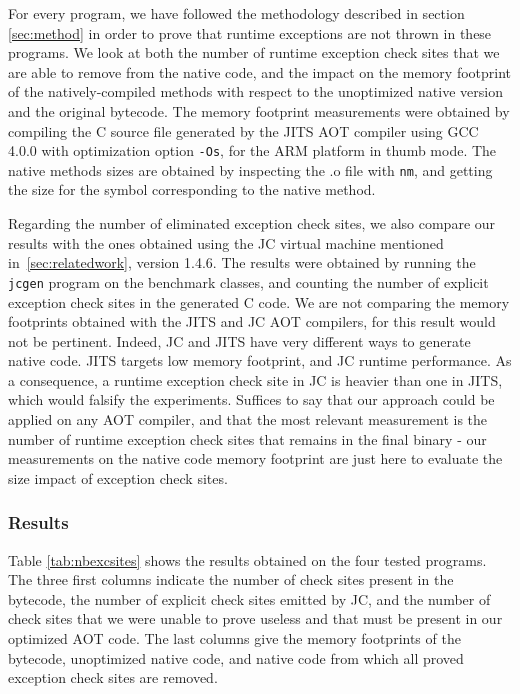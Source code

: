 For every program, we have followed the methodology described in section \ref{sec:method} in order to prove that runtime exceptions are not thrown in these programs. We look at both the number of runtime exception check sites that we are able to remove from the native code, and the impact on the memory footprint of the natively-compiled methods with respect to the unoptimized native version and the original bytecode. The memory footprint measurements were obtained by compiling the C source file generated by the JITS AOT compiler using GCC 4.0.0 with optimization option \texttt{-Os}, for the ARM platform in thumb mode. The native methods sizes are obtained by inspecting the .o file with \texttt{nm}, and getting the size for the symbol corresponding to the native method.

Regarding the number of eliminated exception check sites, we also compare our results with the ones obtained using the JC virtual machine mentioned in~\ref{sec:relatedwork}, version 1.4.6. The results were obtained by running the \texttt{jcgen} program on the benchmark classes, and counting the number of explicit exception check sites in the generated C code. We are not comparing the memory footprints obtained with the JITS and JC AOT compilers, for this result would not be pertinent. Indeed, JC and JITS have very different ways to generate native code. JITS targets low memory footprint, and JC runtime performance. As a consequence, a runtime exception check site in JC is heavier than one in JITS, which would falsify the experiments. Suffices to say that our approach could be applied on any AOT compiler, and that the most relevant measurement is the number of runtime exception check sites that remains in the final binary - our measurements on the native code memory footprint are just here to evaluate the size impact of exception check sites.

\subsubsection{Results}
\label{results}
Table \ref{tab:nbexcsites} shows the results obtained on the four tested programs. The three first columns indicate the number of check sites present in the bytecode, the number of explicit check sites emitted by JC, and the number of check sites that we were unable to prove useless and that must be present in our optimized AOT code. The last columns give the memory footprints of the bytecode, unoptimized native code, and native code from which all proved exception check sites are removed.

